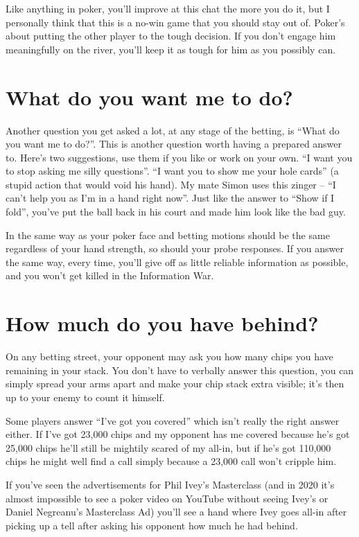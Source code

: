 \begin{itemize}
    Like anything in poker, you'll improve at this chat the more you
    do it, but I personally think that this is a no-win game that you
    should stay out of. Poker's about putting the other player to the
    tough decision. If you don't engage him meaningfully on the
    river, you'll keep it as tough for him as you possibly can.
    
\end{itemize}

\section{What do you want me to do?}

Another question you get asked a lot, at any stage of the betting, is
``What do you want me to do?''. This is another question worth having
a prepared answer to. Here's two suggestions, use them if you
like or work on your own. ``I want you to stop asking me silly
questions''. ``I want you to show me your hole cards'' (a stupid
action that would void his hand). My mate Simon uses
this zinger -- ``I can't help you as I'm in a hand right
now''. Just like the answer to ``Show if I fold'', you've put the
ball back in his court and made him look like the bad guy.

In the same way as your poker face and betting motions should be the
same regardless of your hand strength, so should your probe
responses. If you answer the same way, every time, you'll give off
as little reliable information as possible, and you won't
get killed in the Information War.

\section{How much do you have behind?}

On any betting street, your opponent may ask you how many chips
you have remaining in your stack. You don't have to verbally answer
this question, you can simply spread your arms apart and make your
chip stack extra visible; it's then up to your enemy to count it
himself.

Some players answer ``I've got you covered'' which isn't really the
right answer either. If I've got 23,000 chips and my opponent has me
covered because he's got 25,000 chips he'll still be mightily scared
of my all-in, but if he's got 110,000 chips he might well find a call
simply because a 23,000 call won't cripple him.

If you've seen the advertisements for Phil Ivey's Masterclass (and
in 2020 it's almost impossible to see a poker video on YouTube without
seeing Ivey's or Daniel Negreanu's Masterclass Ad) you'll see
a hand where Ivey goes all-in after picking up a tell after asking
his opponent how much he had behind.

